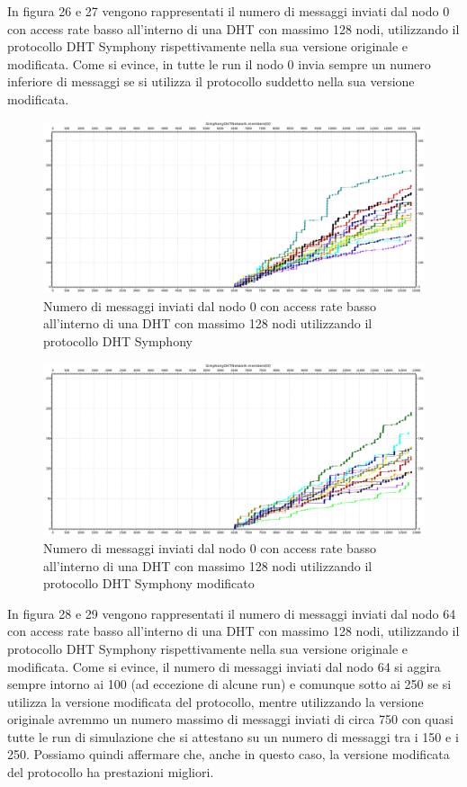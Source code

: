 \documentclass[	
	DIV=calc,
	paper=a4,
	fontsize=11pt,
	onecolumn
]{scrartcl} %
\begin{document}
	In figura 26 e 27 vengono rappresentati il numero di messaggi inviati dal nodo 0 con access rate basso all'interno di una DHT con massimo 128 nodi, utilizzando il protocollo DHT Symphony rispettivamente nella sua versione originale e modificata. Come si evince, in tutte le run il nodo 0 invia sempre un numero inferiore di messaggi se si utilizza il protocollo suddetto nella sua versione modificata.
	
	\begin{figure}[H]
		\centering
		\includegraphics[scale=0.35]	{SymphonyDHT/plots/MessagesSentByEveryNode/128_Nodes_SlowAccess/SymphonyDHT_128Nodes_SlowAccess_Node0.png}
		\caption{Numero di messaggi inviati dal nodo 0 con access rate basso all'interno di una DHT con massimo 128 nodi utilizzando il protocollo DHT Symphony}
		\label{Figura 26}
	\end{figure}
	\begin{figure}[H]
		\centering
		\includegraphics[scale=0.35]	{SymphonyDHTMod/plots/MessagesSentByEveryNode/128_Nodes_SlowAccess/SymphonyDHTMod_128Nodes_SlowAccess_Node0.png}
		\caption{Numero di messaggi inviati dal nodo 0 con access rate basso all'interno di una DHT con massimo 128 nodi utilizzando il protocollo DHT Symphony modificato}
		\label{Figura 27}
	\end{figure}
	
	In figura 28 e 29 vengono rappresentati il numero di messaggi inviati dal nodo 64 con access rate basso all'interno di una DHT con massimo 128 nodi, utilizzando il protocollo DHT Symphony rispettivamente nella sua versione originale e modificata. Come si evince, il numero di messaggi inviati dal nodo 64 si aggira sempre intorno ai 100 (ad eccezione di alcune run) e comunque sotto ai 250 se si utilizza la versione modificata del protocollo, mentre utilizzando la versione originale avremmo un numero massimo di messaggi inviati di circa 750 con quasi tutte le run di simulazione che si attestano su un numero di messaggi tra i 150 e i 250. Possiamo quindi affermare che, anche in questo caso, la versione modificata del protocollo ha prestazioni migliori.
	
\end{document}
